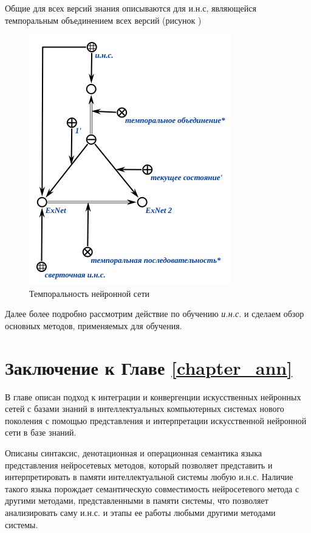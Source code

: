 Общие для всех версий знания описываются для и.н.с, являющейся темпоральным объединением всех версий (рисунок )

\begin{figure}[H]
	\centering
	\includegraphics[scale=0.8]{author/part3/figures/temporal_neural_network_scg.png}
	\caption{Темпоральность нейронной сети}
	\label{fig:temporal_neural_network_scg}
\end{figure}

Далее более подробно рассмотрим действие по обучению \textit{и.н.с.} и сделаем обзор основных методов, применяемых для обучения.

\section*{Заключение к Главе \ref{chapter_ann}}
В главе описан подход к интеграции и конвергенции искусственных нейронных сетей с базами знаний в интеллектуальных компьютерных системах нового поколения с помощью представления и интерпретации искусственной нейронной сети в базе знаний.

Описаны синтаксис, денотационная и операционная семантика языка представления нейросетевых методов, который позволяет представить и интерпретировать в памяти интеллектуальной системы любую и.н.с. Наличие такого языка порождает семантическую совместимость нейросетевого метода с другими методами, представленными в памяти системы, что позволяет анализировать саму и.н.с. и этапы ее работы любыми другими методами системы.

